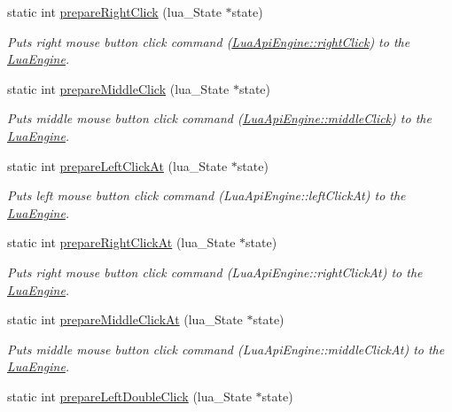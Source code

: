 \begin{DoxyCompactItemize}
static int \hyperlink{class_lua_api_engine_a516e303be81f5691e5963e6a470a0d6c}{prepare\-Right\-Click} (lua\-\_\-\-State $\ast$state)
\begin{DoxyCompactList}\small\item\em Puts right mouse button click command (\hyperlink{class_lua_api_engine_a7b3664b6f2593d3bd817edeee61a18e6}{Lua\-Api\-Engine\-::right\-Click}) to the \hyperlink{class_lua_engine}{Lua\-Engine}. \end{DoxyCompactList}\item 
static int \hyperlink{class_lua_api_engine_a4644c161b4336ff836816a8ecbed562e}{prepare\-Middle\-Click} (lua\-\_\-\-State $\ast$state)
\begin{DoxyCompactList}\small\item\em Puts middle mouse button click command (\hyperlink{class_lua_api_engine_a633c229323434db2d1af7f66c1517a34}{Lua\-Api\-Engine\-::middle\-Click}) to the \hyperlink{class_lua_engine}{Lua\-Engine}. \end{DoxyCompactList}\item 
static int \hyperlink{class_lua_api_engine_a2109f8d536e8238941ea3d5254feee6e}{prepare\-Left\-Click\-At} (lua\-\_\-\-State $\ast$state)
\begin{DoxyCompactList}\small\item\em Puts left mouse button click command (Lua\-Api\-Engine\-::left\-Click\-At) to the \hyperlink{class_lua_engine}{Lua\-Engine}. \end{DoxyCompactList}\item 
static int \hyperlink{class_lua_api_engine_ac5b06389118f48d5e320b81c3c5ba5d0}{prepare\-Right\-Click\-At} (lua\-\_\-\-State $\ast$state)
\begin{DoxyCompactList}\small\item\em Puts right mouse button click command (Lua\-Api\-Engine\-::right\-Click\-At) to the \hyperlink{class_lua_engine}{Lua\-Engine}. \end{DoxyCompactList}\item 
static int \hyperlink{class_lua_api_engine_a3ecc218b3b366bde3d8c4e7c8f039f5e}{prepare\-Middle\-Click\-At} (lua\-\_\-\-State $\ast$state)
\begin{DoxyCompactList}\small\item\em Puts middle mouse button click command (Lua\-Api\-Engine\-::middle\-Click\-At) to the \hyperlink{class_lua_engine}{Lua\-Engine}. \end{DoxyCompactList}\item 
static int \hyperlink{class_lua_api_engine_ab545cafb77e825b84d787d0dbae34bc2}{prepare\-Left\-Double\-Click} (lua\-\_\-\-State $\ast$state)

\end{DoxyCompactItemize}
